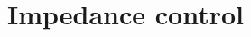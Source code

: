 
\pagestyle{fancy} 
\chapter{Impedance control}
\label{cha:chap7}



\clearpage{\pagestyle{empty}\cleardoublepage}